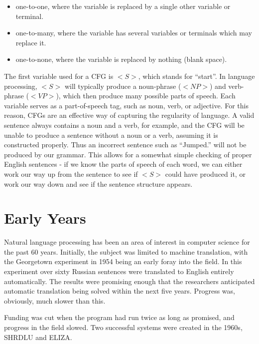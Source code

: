\begin{itemize}
	\item one-to-one, where the variable is replaced by a single other variable or terminal.
	\item one-to-many, where the variable has several variables or terminals which may replace it.
	\item one-to-none, where the variable is replaced by nothing (blank space).
\end{itemize}

The first variable used for a CFG is $<S>$, which stands for ``start''. In language processing, $<S>$ will typically produce a noun-phrase ($<NP>$) and verb-phrase ($<VP>$), which then produce many possible parts of speech. Each variable serves as a part-of-speech tag, such as noun, verb, or adjective. For this reason, CFGs are an effective way of capturing the regularity of language. A valid sentence always contains a noun and a verb, for example, and the CFG will be unable to produce a sentence without a noun or a verb, assuming it is constructed properly. Thus an incorrect sentence such as ``Jumped.'' will not be produced by our grammar. This allows for a somewhat simple checking of proper English sentences - if we know the parts of speech of each word, we can either work our way up from the sentence to see if $<S>$ could have produced it, or work our way down and see if the sentence structure appears.

\section{Early Years}

Natural language processing has been an area of interest in computer science for the past 60 years. Initially, the subject was limited to machine translation, with the Georgetown experiment in 1954 being an early foray into the field. In this experiment over sixty Russian sentences were translated to English entirely automatically. The results were promising enough that the researchers anticipated automatic translation being solved within the next five years. \cite{Hutchins} Progress was, obviously, much slower than this.             

 
Funding was cut when the program had run twice as long as promised, and progress in the field slowed. Two successful systems were created in the 1960s, SHRDLU and ELIZA.
                                                                                          
